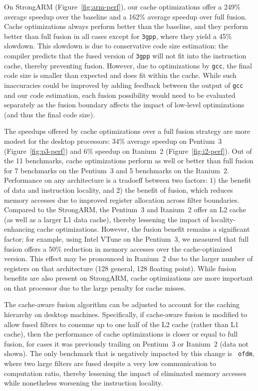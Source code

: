 On StrongARM (Figure~\ref{fig:arm-perf}), our cache optimizations
offer a 249\% average speedup over the baseline and a 162\%
average speedup over full fusion.  Cache optimizations always perform
better than the baseline, and they perform better than full fusion in
all cases except for \texttt{3gpp}, where they yield a 45\% slowdown.
This slowdown is due to conservative code size estimation: the
compiler predicts that the fused version of \texttt{3gpp} will not fit
into the instruction cache, thereby preventing fusion.  However, due
to optimizations by {\tt gcc}, the final code size is smaller than
expected and does fit within the cache.  While such inaccuracies could
be improved by adding feedback between the output of {\tt gcc} and our
code estimation, each fusion possibility would need to be evaluated
separately as the fusion boundary affects the impact of low-level
optimizations (and thus the final code size).

The speedups offered by cache optimizations over a full fusion
strategy are more modest for the desktop processors: 34\% average
speedup on Pentium~3 (Figure~\ref{fig:p3-perf}) and 6\% speedup on
Itanium~2 (Figure~\ref{fig:i2-perf}).  Out of the 11 benchmarks, cache
optimizations perform as well or better than full fusion for 7
benchmarks on the Pentium~3 and 5 benchmarks on the
Itanium~2.  Performance on any architecture is a tradoeff between two
factors: 1) the benefit of data and instruction locality, and 2) the
benefit of fusion, which reduces memory accesses due to improved
register allocation across filter boundaries.  Compared to the
StrongARM, the Pentium~3 and Itanium~2 offer an L2 cache (as well as a
larger L1 data cache), thereby lessening the impact of
locality-enhancing cache optimizations.  However, the fusion benefit
remains a significant factor; for example, using Intel VTune on the
Pentium~3, we measured that full fusion offers a 50\% reduction in
memory accesses over the cache-optimized version.  This effect may be
pronounced in Itanium~2 due to the larger number of registers on that
architecture (128 general, 128 floating point).  While fusion benefits
are also present on StrongARM, cache optimizations are more important
on that processor due to the large penalty for cache misses.

The cache-aware fusion algorithm can be adjusted to account for the
caching hierarchy on desktop machines.  Specifically, if cache-aware
fusion is modified to allow fused filters to consume up to one half of
the L2 cache (rather than L1 cache), then the performance of cache
optimizations is closer or equal to full fusion, for cases it was
previously trailing on Pentium~3 or Itanium~2 (data not shown).  The
only benchmark that is negatively impacted by this change is {\tt
ofdm}, where two large filters are fused despite a very low
communication to computation ratio, thereby lessening the impact of
eliminated memory accesses while nonetheless worsening the instruction
locality.

